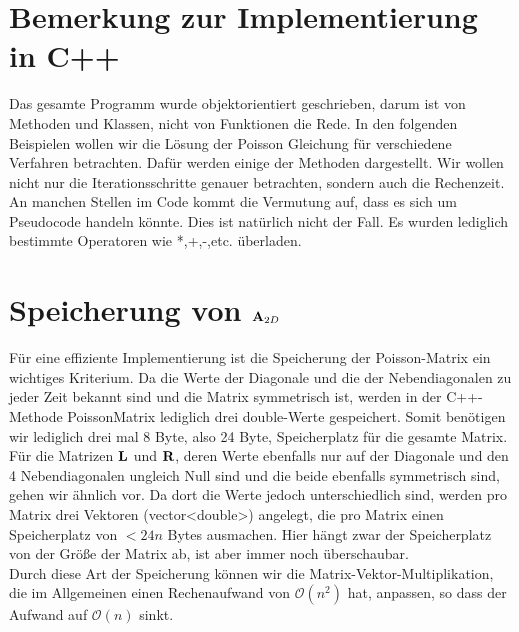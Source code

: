 
\section{Bemerkung zur Implementierung in C++}

Das gesamte Programm wurde objektorientiert geschrieben, darum ist von Methoden und Klassen, nicht von Funktionen die Rede. In den folgenden Beispielen wollen wir die Lösung der Poisson Gleichung für verschiedene Verfahren betrachten. Dafür werden einige der Methoden dargestellt. Wir wollen nicht nur die Iterationsschritte genauer betrachten, sondern auch die Rechenzeit.\\
An manchen Stellen im Code kommt die Vermutung auf, dass es sich um Pseudocode handeln könnte. Dies ist natürlich nicht der Fall. Es wurden lediglich bestimmte Operatoren wie *,+,-,etc. überladen.

\section{Speicherung von ${\textbf{A}}_{2D}$}

Für eine effiziente Implementierung ist die Speicherung der Poisson-Matrix ein wichtiges Kriterium. Da die Werte der Diagonale und die der Nebendiagonalen zu jeder Zeit bekannt sind und die Matrix symmetrisch ist, werden in der C++-Methode PoissonMatrix lediglich drei double-Werte gespeichert. Somit benötigen wir lediglich drei mal 8 Byte, also 24 Byte, Speicherplatz für die gesamte Matrix.\\
Für die Matrizen ${\textbf{L}}$ und ${\textbf{R}}$, deren Werte ebenfalls nur auf der Diagonale und den 4 Nebendiagonalen ungleich Null sind und die beide ebenfalls symmetrisch sind, gehen wir ähnlich vor. Da dort die Werte jedoch unterschiedlich sind, werden pro Matrix drei Vektoren (vector<double>) angelegt, die pro Matrix einen Speicherplatz von  $< 24n$ Bytes ausmachen. Hier hängt zwar der Speicherplatz von der Größe der Matrix ab, ist aber immer noch überschaubar.\\
Durch diese Art der Speicherung können wir die Matrix-Vektor-Multiplikation, die im Allgemeinen einen Rechenaufwand von $\mathcal{O}(n^{2})$ hat, anpassen, so dass der Aufwand auf $\mathcal{O}(n)$ sinkt.

